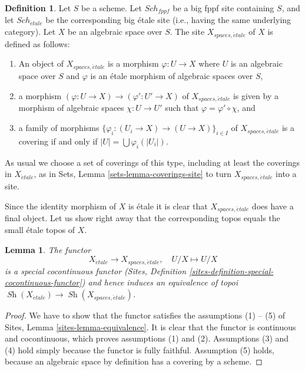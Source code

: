\documentclass{stacks-project}
\theoremstyle{plain}
\newtheorem{lemma}[subsection]{Lemma}
\theoremstyle{definition}
\newtheorem{definition}[subsection]{Definition}
\theoremstyle{remark}
\numberwithin{equation}{subsection}
\def\Sch{\mathit{Sch}}
\def\Sh{\mathop{\mathit{Sh}}\nolimits}
\def\etale{{\acute{e}tale}}
\begin{document}
\begin{definition}
\label{definition-spaces-etale-site}
Let $S$ be a scheme.
Let $\Sch_{fppf}$ be a big fppf site containing $S$,
and let $\Sch_\etale$ be the corresponding big \'etale site
(i.e., having the same underlying category).
Let $X$ be an algebraic space over $S$.
The site {\it $X_{spaces, \etale}$} of $X$ is defined as follows:
\begin{enumerate}
\item An object of $X_{spaces, \etale}$ is a morphism
$\varphi : U \to X$ where $U$ is an algebraic space over $S$ and
$\varphi$ is an \'etale morphism of algebraic spaces over $S$,
\item a morphism $(\varphi : U \to X) \to (\varphi' : U' \to X)$ of
$X_{spaces, \etale}$ is given by a morphism of algebraic spaces
$\chi : U \to U'$ such that $\varphi = \varphi' \circ \chi$, and
\item a family of morphisms
$\{\varphi_i : (U_i \to X) \to (U \to X)\}_{i \in I}$
of $X_{spaces, \etale}$ is a covering if and only if
$|U| = \bigcup \varphi_i(|U_i|)$.
\end{enumerate}
As usual we choose a set of coverings of this type, including at least
the coverings in $X_\etale$, as in
Sets, Lemma \ref{sets-lemma-coverings-site}
to turn $X_{spaces, \etale}$ into a site.
\end{definition}

\noindent
Since the identity morphism of $X$ is \'etale it is clear that
$X_{spaces, \etale}$ does have a final object.
Let us show right away that the corresponding topos equals the
small \'etale topos of $X$.

\begin{lemma}
\label{lemma-compare-etale-sites}
The functor
$$
X_\etale \longrightarrow X_{spaces, \etale}, \quad
U/X \longmapsto U/X
$$
is a special cocontinuous functor
(Sites, Definition \ref{sites-definition-special-cocontinuous-functor})
and hence induces an equivalence of topoi
$\Sh(X_\etale) \to \Sh(X_{spaces, \etale})$.
\end{lemma}

\begin{proof}
We have to show that the functor satisfies the assumptions (1) -- (5) of
Sites, Lemma \ref{sites-lemma-equivalence}.
It is clear that the functor is continuous and cocontinuous, which
proves assumptions (1) and (2).
Assumptions (3) and (4) hold simply because the functor is fully faithful.
Assumption (5) holds, because an algebraic space by definition has
a covering by a scheme.
\end{proof}
\end{document}
